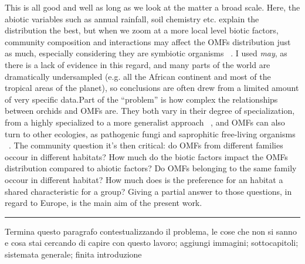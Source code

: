 This is all good and well as long as we look at the matter a broad scale. Here, the abiotic variables such as annual rainfall, soil chemistry etc. explain the distribution the best, but when we zoom at a more local level biotic factors, community composition and interactions may affect the OMFs distribution just as much, especially considering they are symbiotic organisms ~\citep{jacquemyn2017}. I used \emph{may}, as there is a lack of evidence in this regard, and many parts of the world are dramatically undersampled (e.g. all the African continent and most of the tropical areas of the planet), so conclusions are often drew from a limited amount of very specific data.Part of the ``problem'' is how complex the relationships between orchids and OMFs are. They both vary in their degree of specialization, from a highly specialized to a more generalist approach ~\citep{mccormick2004, girlanda2011, heijden2015}, and OMFs can also turn to other ecologies, as pathogenic fungi and saprophitic free-living organisms ~\citep{veldre2013}.
The community question it's then critical: do OMFs from different families occour in different habitats? How much do the biotic factors impact the OMFs distribution compared to abiotic factors?
Do OMFs belonging to the same family occour in different habitat? How much does is the preference for an habitat a shared characteristic for a group?
Giving a partial answer to those questions, in regard to Europe, is the main aim of the present work.

\begin{center}\rule{3in}{0.4pt}\end{center}

Termina questo paragrafo contestualizzando il problema, le cose che non si sanno e cosa stai cercando di capire con questo lavoro;
aggiungi immagini;
sottocapitoli;
sistemata generale;
finita introduzione




